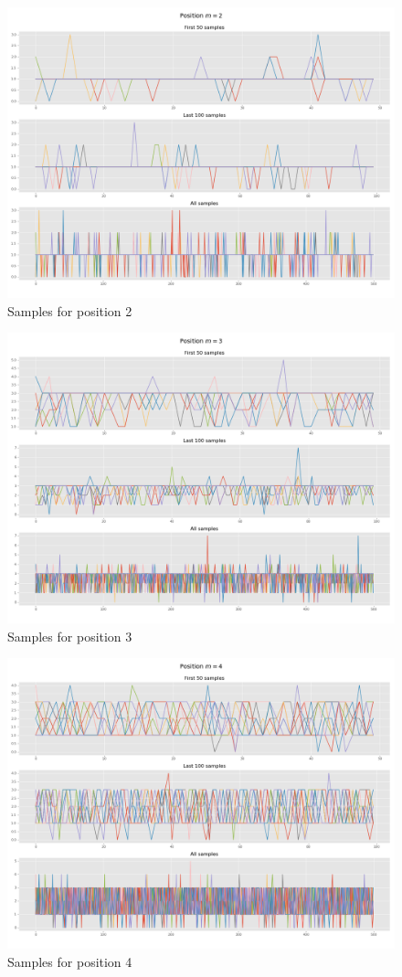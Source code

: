 \documentclass[]{article}
\begin{document}
	\begin{figure}[H]
		\begin{center}
			
			\includegraphics[width=.7\textwidth]{task4/figures/T_2_4/Q2/convergence_pos2.png}
			\caption*{Samples for position 2}
		\end{center}
	\end{figure}
	
	\begin{figure}[H]
		\begin{center}
			
			\includegraphics[width=.7\textwidth]{task4/figures/T_2_4/Q2/convergence_pos3.png}
			\caption*{Samples for position 3}
		\end{center}
	\end{figure}
	
	\begin{figure}[H]
		\begin{center}
			
			\includegraphics[width=.7\textwidth]{task4/figures/T_2_4/Q2/convergence_pos4.png}
			\caption*{Samples for position 4}
		\end{center}
	\end{figure}
	
\end{document}
